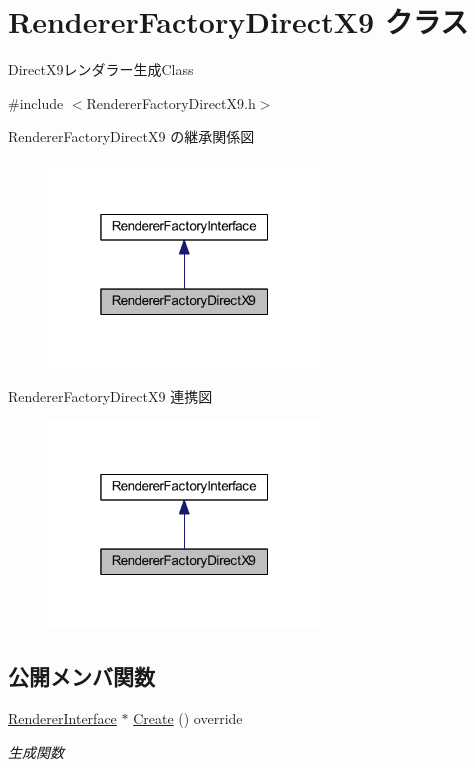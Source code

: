 \hypertarget{class_renderer_factory_direct_x9}{}\section{Renderer\+Factory\+Direct\+X9 クラス}
\label{class_renderer_factory_direct_x9}


Direct\+X9レンダラー生成\+Class  




{\ttfamily \#include $<$Renderer\+Factory\+Direct\+X9.\+h$>$}



Renderer\+Factory\+Direct\+X9 の継承関係図
\nopagebreak
\begin{figure}[H]
\begin{center}
\leavevmode
\includegraphics[width=205pt]{class_renderer_factory_direct_x9__inherit__graph}
\end{center}
\end{figure}


Renderer\+Factory\+Direct\+X9 連携図
\nopagebreak
\begin{figure}[H]
\begin{center}
\leavevmode
\includegraphics[width=205pt]{class_renderer_factory_direct_x9__coll__graph}
\end{center}
\end{figure}
\subsection*{公開メンバ関数}
\begin{DoxyCompactItemize}
\item 
\mbox{\hyperlink{class_renderer_interface}{Renderer\+Interface}} $\ast$ \mbox{\hyperlink{class_renderer_factory_direct_x9_aa64ac54f3efe121f531a28dd3b7690e3}{Create}} () override
\begin{DoxyCompactList}\small\item\em 生成関数 \end{DoxyCompactList}\end{DoxyCompactItemize}


